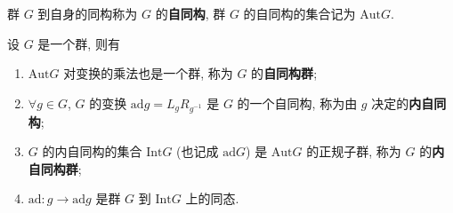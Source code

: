 \documentclass[../../main.tex]{subfiles}
\begin{document}
\begin{definition}
群 \( G \) 到自身的同构称为 \( G \) 的\textbf{自同构}, 群 \( G \) 的自同构的集合记为 \( \text{Aut}G \).
\end{definition}

\begin{theorem}
设 \( G \) 是一个群, 则有
\begin{enumerate}[(1)]
\item \( \text{Aut}G \) 对变换的乘法也是一个群, 称为 \( G \) 的\textbf{自同构群};
\item \( \forall g \in G \), \( G \) 的变换 \( \text{ad}g = L_gR_{g^{-1}} \) 是 \( G \) 的一个自同构, 称为由 \( g \) 决定的\textbf{内自同构};
\item \( G \) 的内自同构的集合 \( \text{Int}G \) (也记成 \( \text{ad}G \)) 是 \( \text{Aut}G \) 的正规子群, 称为 \( G \) 的\textbf{内自同构群};
\item \( \text{ad}: g \to \text{ad}g \) 是群 \( G \) 到 \( \text{Int}G \) 上的同态.
\end{enumerate}
\end{theorem}
\end{document}
